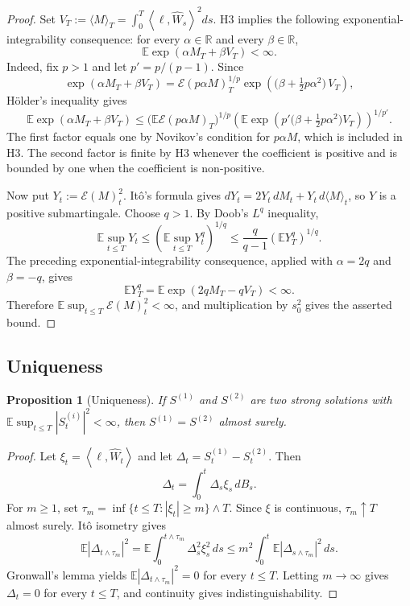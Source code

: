 \documentclass[11pt,oneside]{article}
\theoremstyle{plain}
\newtheorem{proposition}[theorem]{Proposition}
\theoremstyle{definition}
\theoremstyle{remark}
\newcommand{\E}{\mathbb{E}}
\newcommand{\cW}{\widehat W}
\newcommand{\abs}[1]{\left\lvert #1\right\rvert}
\newcommand{\inner}[2]{\left\langle #1,#2\right\rangle}
\begin{document}
\begin{proof}
Set $V_T:=\langle M\rangle_T=\int_0^T\inner{\ell}{\cW_s}^2ds$. H3 implies the following exponential-integrability consequence: for every $\alpha\in\mathbb R$ and every $\beta\in\mathbb R$,
\[
\E\exp(\alpha M_T+\beta V_T)<\infty.
\]
Indeed, fix $p>1$ and let $p'=p/(p-1)$. Since
\[
\exp(\alpha M_T+\beta V_T)
=\mathcal E(p\alpha M)_T^{1/p}
  \exp\!\left(\bigl(\beta+\tfrac12 p\alpha^2\bigr)\,V_T\right),
\]
H\"older's inequality gives
\[
\E\exp(\alpha M_T+\beta V_T)
\leq
\bigl(\E\mathcal E(p\alpha M)_T\bigr)^{1/p}
\left(\E\exp\left(p'\bigl(\beta+\tfrac12 p\alpha^2\bigr)V_T\right)\right)^{1/p'}.
\]
The first factor equals one by Novikov's condition for $p\alpha M$, which is included in H3. The second factor is finite by H3 whenever the coefficient is positive and is bounded by one when the coefficient is non-positive.

Now put $Y_t:=\mathcal E(M)_t^2$. It\^o's formula gives $dY_t=2Y_t\,dM_t+Y_t\,d\langle M\rangle_t$, so $Y$ is a positive submartingale. Choose $q>1$. By Doob's $L^q$ inequality,
\[
\E\sup_{t\leq T}Y_t
\leq
\left(\E\sup_{t\leq T}Y_t^q\right)^{1/q}
\leq
\frac{q}{q-1}\left(\E Y_T^q\right)^{1/q}.
\]
The preceding exponential-integrability consequence, applied with $\alpha=2q$ and $\beta=-q$, gives
\[
\E Y_T^q=\E\exp(2qM_T-qV_T)<\infty.
\]
Therefore $\E\sup_{t\leq T}\mathcal E(M)_t^2<\infty$, and multiplication by $s_0^2$ gives the asserted bound.
\end{proof}

\subsection{Uniqueness}\label{subsec:uniqueness}

\begin{proposition}[Uniqueness]\label{prop:uniqueness}
If $S^{(1)}$ and $S^{(2)}$ are two strong solutions with $\E\sup_{t\leq T}\abs{S_t^{(i)}}^2<\infty$, then $S^{(1)}=S^{(2)}$ almost surely.
\end{proposition}

\begin{proof}
Let $\xi_t=\inner{\ell}{\cW_t}$ and let $\Delta_t=S_t^{(1)}-S_t^{(2)}$. Then
\[
\Delta_t=\int_0^t\Delta_s\xi_s\,dB_s.
\]
For $m\geq1$, set $\tau_m=\inf\{t\leq T:\abs{\xi_t}\geq m\}\wedge T$. Since $\xi$ is continuous, $\tau_m\uparrow T$ almost surely. It\^o isometry gives
\[
\E\abs{\Delta_{t\wedge\tau_m}}^2
=\E\int_0^{t\wedge\tau_m}\Delta_s^2\xi_s^2\,ds
\leq m^2\int_0^t\E\abs{\Delta_{s\wedge\tau_m}}^2\,ds.
\]
Gronwall's lemma yields $\E\abs{\Delta_{t\wedge\tau_m}}^2=0$ for every $t\leq T$. Letting $m\to\infty$ gives $\Delta_t=0$ for every $t\leq T$, and continuity gives indistinguishability.
\end{proof}
\end{document}
